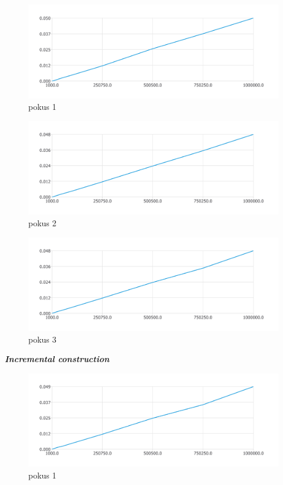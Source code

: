 \documentclass{article}
\begin{document}
\begin{figure}[htbp]
\centering
        \includegraphics[clip, trim=0cm 0cm 0cm 0cm, width=1\textwidth]{pdf13.pdf}
        \caption{pokus 1}
\end{figure}
\begin{figure}[htbp]
\centering
        \includegraphics[clip, trim=0cm 0cm 0cm 0cm, width=1\textwidth]{pdf14.pdf}
        \caption{pokus 2}
\end{figure}
\begin{figure}[htbp]
\centering
        \includegraphics[clip, trim=0cm 0cm 0cm 0cm, width=1\textwidth]{pdf15.pdf}
        \caption{pokus 3}
\end{figure}
\clearpage
\newpage
\textit{\textbf {Incremental construction}}
\\
\begin{figure}[htbp]
\centering
        \includegraphics[clip, trim=0cm 0cm 0cm 0cm, width=1\textwidth]{pdf16.pdf}
        \caption{pokus 1}
\end{figure}
\end{document}
